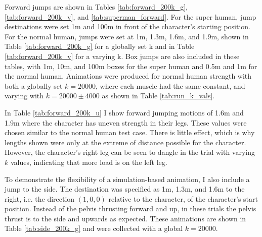 Forward jumps are shown in Tables \ref{tab:forward_200k_g}, \ref{tab:forward_200k_v}, and \ref{tab:superman_forward}. For the super human, jump destinations were set 1m and 100m in front of the character's starting position.  For the normal human, jumps were set at 1m, 1.3m, 1.6m, and 1.9m, shown in Table \ref{tab:forward_200k_g} for a globally set k and in Table \ref{tab:forward_200k_v} for a varying k.  Box jumps are also included in these tables, with 1m, 10m, and 100m boxes for the super human and 0.5m and 1m for the normal human.  Animations were produced for normal human strength with both a globally set $k=20000$, where each muscle had the same constant, and varying with $k=20000\pm 4000$ as shown in Table \ref{tab:run_k_vals}.

In Table \ref{tab:forward_200k_u} I show forward jumping motions of 1.6m and 1.9m where the character has uneven strength in their legs.  These values were chosen similar to the normal human test case.  There is little effect, which is why lengths shown were only at the extreme of distance possible for the character.  However, the character's right leg can be seen to dangle in the trial with varying $k$ values, indicating that more load is on the left leg.

To demonstrate the flexibility of a simulation-based animation, I also include a jump to the side.  The destination was specified as 1m, 1.3m, and 1.6m to the right, i.e. the direction $(1, 0, 0)$ relative to the character, of the character's start position.  Instead of the pelvis thrusting forward and up, in these trials the pelvis thrust is to the side and upwards as expected.  These animations are shown in Table \ref{tab:side_200k_g} and were collected with a global $k=20000$.

\newcommand{\floatedfig}[1]{\begin{subfigure}[h]{0.2\textwidth}\vspace{1mm}\texttt{[image: \#1]}\vspace{1mm}\end{subfigure}\hspace{0.025\textwidth}}
\newcommand{\framesubfig}[1]{\begin{subfigure}[h]{0.24\textwidth}\texttt{[image: \#1]}\end{subfigure}}

